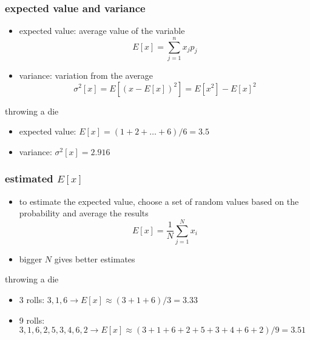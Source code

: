 \documentclass[10pt]{beamer}
\begin{document}
\begin{frame}
\frametitle{expected value and variance}
\begin{itemize}
  \item expected value: average value of the variable
\begin{equation*}
  E[x] = \sum_{j=1}^{n}x_j p_j
\end{equation*}
  \item variance: variation from the average
\begin{equation*}
  \sigma^2[x] = E[(x-E[x])^2] = E[x^2] - E[x]^2
\end{equation*}
\end{itemize}
\begin{block}{throwing a die}
\begin{itemize}
  \item expected value: $E[x] = (1+2+\dots+6)/6 = 3.5$
  \item variance: $\sigma^2[x] = 2.916$
\end{itemize}
\end{block}  
\end{frame}
\begin{frame}
\frametitle{estimated $E[x]$}
\begin{itemize}
  \item to estimate the expected value, choose a set of random values
based on the probability and average the results
\begin{equation*}
  E[x] = \frac{1}{N} \sum_{j=1}^{N} x_i
\end{equation*}
  \item bigger $N$ gives better estimates
\end{itemize}
\begin{block}{throwing a die}
\begin{itemize}
  \item 3 rolls: $3,1,6 \rightarrow E[x] \approx (3+1+6)/3 = 3.33$
  \item 9 rolls: $3,1,6,2,5,3,4,6,2 \rightarrow E[x] \approx (3+1+6+2+5+3+4+6+2)/9 = 3.51$
\end{itemize}
\end{block}  
\end{frame}
\end{document}
